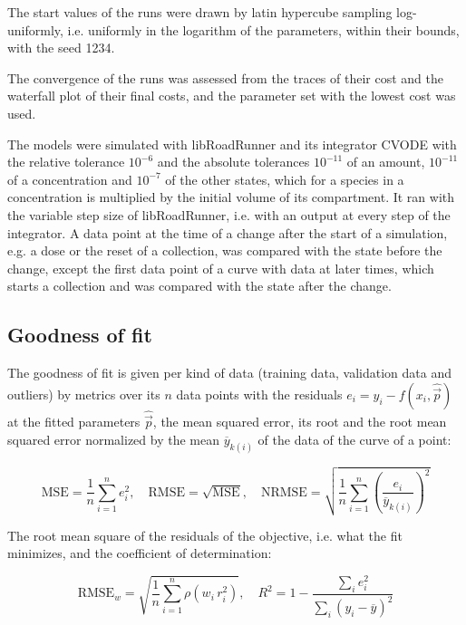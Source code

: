 The start values of the runs were drawn by latin hypercube sampling \cite{McKay1979} log-uniformly, i.e. uniformly in the logarithm of the parameters, within their bounds, with the seed 1234.

The convergence of the runs was assessed from the traces of their cost and the waterfall plot of their final costs, and the parameter set with the lowest cost was used.

The models were simulated with libRoadRunner \cite{Welsh2023} and its integrator CVODE \cite{Hindmarsh2005} with the relative tolerance $10^{-6}$ and the absolute tolerances $10^{-11}$ of an amount, $10^{-11}$ of a concentration and $10^{-7}$ of the other states, which for a species in a concentration is multiplied by the initial volume of its compartment. It ran with the variable step size of libRoadRunner, i.e. with an output at every step of the integrator. A data point at the time of a change after the start of a simulation, e.g. a dose or the reset of a collection, was compared with the state before the change, except the first data point of a curve with data at later times, which starts a collection and was compared with the state after the change.

\subsection{Goodness of fit}

The goodness of fit is given per kind of data (training data, validation data and outliers) by metrics over its $n$ data points with the residuals $e_i = y_i - f(x_i, \hat{\vec{p}})$ at the fitted parameters $\hat{\vec{p}}$, the mean squared error, its root and the root mean squared error normalized by the mean $\overline{y}_{k(i)}$ of the data of the curve of a point:

\begin{equation}
\mathrm{MSE} = \frac{1}{n} \sum_{i=1}^{n} e_i^2, \quad \mathrm{RMSE} = \sqrt{\mathrm{MSE}}, \quad \mathrm{NRMSE} = \sqrt{\frac{1}{n} \sum_{i=1}^{n} \left(\frac{e_i}{\overline{y}_{k(i)}}\right)^2}
\end{equation}

The root mean square of the residuals of the objective, i.e. what the fit minimizes, and the coefficient of determination:

\begin{equation}
\mathrm{RMSE}_w = \sqrt{\frac{1}{n} \sum_{i=1}^{n} \rho\left(w_i\, r_i^2\right)}, \quad R^2 = 1 - \frac{\sum_{i} e_i^2}{\sum_{i} \left(y_i - \overline{y}\right)^2}
\end{equation}

